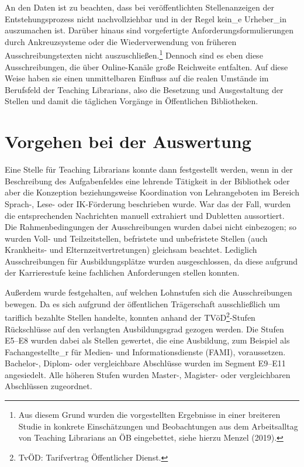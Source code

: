\documentclass[a4paper,
fontsize=11pt,
oneside,
numbers=noperiodatend,
parskip=half-,
bibliography=totoc,
final
]{scrartcl}
\begin{document}
An den Daten ist zu beachten, dass bei veröffentlichten Stellenanzeigen
der Entstehungsprozess nicht nachvollziehbar und in der Regel kein\_e
Urheber\_in auszumachen ist. Darüber hinaus sind vorgefertigte
Anforderungsformulierungen durch Ankreuzsysteme oder die
Wiederverwendung von früheren Ausschreibungstexten nicht
auszuschließen.\footnote{Aus diesem Grund wurden die vorgestellten
  Ergebnisse in einer breiteren Studie in konkrete Einschätzungen und
  Beobachtungen aus dem Arbeitsalltag von Teaching Librarians an ÖB
  eingebettet, siehe hierzu Menzel (2019).} Dennoch sind es eben diese
Ausschreibungen, die über Online-Kanäle große Reichweite entfalten. Auf
diese Weise haben sie einen unmittelbaren Einfluss auf die realen
Umstände im Berufsfeld der Teaching Librarians, also die Besetzung und
Ausgestaltung der Stellen und damit die täglichen Vorgänge in
Öffentlichen Bibliotheken.

\hypertarget{vorgehen-bei-der-auswertung}{%
\section{Vorgehen bei der
Auswertung}\label{vorgehen-bei-der-auswertung}}

Eine Stelle für Teaching Librarians konnte dann festgestellt werden,
wenn in der Beschreibung des Aufgabenfeldes eine lehrende Tätigkeit in
der Bibliothek oder aber die Konzeption beziehungsweise Koordination von
Lehrangeboten im Bereich Sprach-, Lese- oder IK-Förderung beschrieben
wurde. War das der Fall, wurden die entsprechenden Nachrichten manuell
extrahiert und Dubletten aussortiert. Die Rahmenbedingungen der
Ausschreibungen wurden dabei nicht einbezogen; so wurden Voll- und
Teilzeitstellen, befristete und unbefristete Stellen (auch Krankheits-
und Elternzeitvertretungen) gleichsam beachtet. Lediglich
Ausschreibungen für Ausbildungsplätze wurden ausgeschlossen, da diese
aufgrund der Karrierestufe keine fachlichen Anforderungen stellen
konnten.

Außerdem wurde festgehalten, auf welchen Lohnstufen sich die
Ausschreibungen bewegen. Da es sich aufgrund der öffentlichen
Trägerschaft ausschließlich um tariflich bezahlte Stellen handelte,
konnten anhand der TVöD\footnote{TvÖD: Tarifvertrag Öffentlicher Dienst.}-Stufen
Rückschlüsse auf den verlangten Ausbildungsgrad gezogen werden. Die
Stufen E5--E8 wurden dabei als Stellen gewertet, die eine Ausbildung,
zum Beispiel als Fachangestellte\_r für Medien- und Informationsdienste
(FAMI), voraussetzen. Bachelor-, Diplom- oder vergleichbare Abschlüsse
wurden im Segment E9--E11 angesiedelt. Alle höheren Stufen wurden
Master-, Magister- oder vergleichbaren Abschlüssen zugeordnet.
\end{document}
